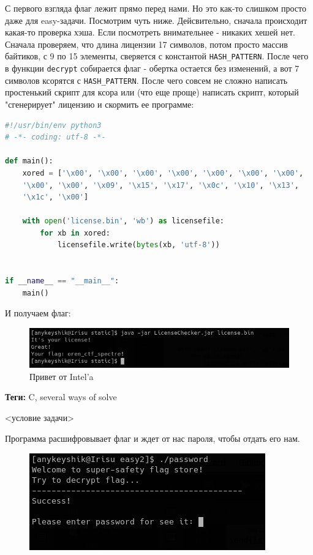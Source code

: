 \documentclass[idxtotoc,hyperref,openany,oneside]{files/reverse} %
\begin{document}
С первого взгляда флаг лежит прямо перед нами. Но это как-то слишком просто даже для easy-задачи. Посмотрим чуть ниже. Дейсвительно, сначала происходит какая-то проверка хэша. Если посмотреть внимательнее - никаких хешей нет. Сначала проверяем, что длина лицензии 17 символов, потом просто массив байтиков, с 9 по 15 элементы, сверяется с константой \verb|HASH_PATTERN|. После чего в функции \verb|decrypt| собирается флаг - обертка остается без изменений, а вот 7 символов ксорятся с \verb|HASH_PATTERN|. После чего совсем не сложно написать простенький скрипт для ксора или (что еще проще) написать скрипт, который "сгенерирует" лицензию и скормить ее программе:
\begin{lstlisting}[language=Python, caption=Генератор лицензии]
#!/usr/bin/env python3
# -*- coding: utf-8 -*-

def main():
    xored = ['\x00', '\x00', '\x00', '\x00', '\x00', '\x00', '\x00',
    '\x00', '\x00', '\x09', '\x15', '\x17', '\x0c', '\x10', '\x13', 
    '\x1c', '\x00']

    with open('license.bin', 'wb') as licensefile:
        for xb in xored:
            licensefile.write(bytes(xb, 'utf-8'))


if __name__ == "__main__":
    main()
\end{lstlisting}

И получаем флаг:
\begin{figure}[H]
\begin{center}
\includegraphics[width=0.7\linewidth]{files/java-flag}
\end{center}
\caption{Привет от Intel'a}
\label{fig:java-flag}
\end{figure}



\textbf{Теги:} C, several ways of solve\vspace{\baselineskip}

\begin{tcolorbox}
<условие задачи>
\end{tcolorbox}

Программа расшифровывает флаг и ждет от нас пароля, чтобы отдать его нам.
\begin{figure}[H]
\begin{center}
\includegraphics[width=0.5\linewidth]{files/enigma-hello}
\end{center}
\label{fig:enigma-hello}
\end{figure}
\end{document}
